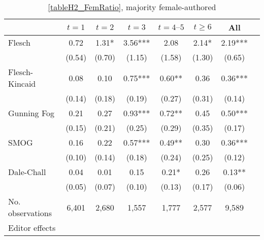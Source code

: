 \begin{table}
    \footnotesize
    \centering
    \begin{threeparttable}
        \caption{\autoref{tableH2_FemRatio}, majority female-authored}
        \label{tableH2_Fem50}
        \begin{tabular}{p{3cm}S@{}S@{}S@{}S@{}S@{}S@{}S@{}}
            \toprule
            &{\(t=1\)}&{\(t=2\)}&{\(t=3\)}&{\(t=4\text{--}5\)}&{\(t\ge6\)}&{All}\\
            \midrule
            Flesch                        &        0.72   &        1.31*  &        3.56***&        2.08   &        2.14*  &        2.19***\\
                                          &      (0.54)   &      (0.70)   &      (1.15)   &      (1.58)   &      (1.30)   &      (0.65)   \\
            Flesch-Kincaid                &        0.08   &        0.10   &        0.75***&        0.60** &        0.36   &        0.36***\\
                                          &      (0.14)   &      (0.18)   &      (0.19)   &      (0.27)   &      (0.31)   &      (0.14)   \\
            Gunning Fog                   &        0.21   &        0.27   &        0.93***&        0.72** &        0.45   &        0.50***\\
                                          &      (0.15)   &      (0.21)   &      (0.25)   &      (0.29)   &      (0.35)   &      (0.17)   \\
            SMOG                          &        0.16   &        0.22   &        0.57***&        0.49** &        0.30   &        0.36***\\
                                          &      (0.10)   &      (0.14)   &      (0.18)   &      (0.24)   &      (0.25)   &      (0.12)   \\
            Dale-Chall                    &        0.04   &        0.01   &        0.15   &        0.21*  &        0.26   &        0.13** \\
                                          &      (0.05)   &      (0.07)   &      (0.10)   &      (0.13)   &      (0.17)   &      (0.06)   \\
            \midrule
            No. observations              &       6,401   &       2,680   &       1,557   &       1,777   &       2,577   &       9,589   \\
            \midrule
            Editor effects       &           {}   &           {}   &           {}   &           {}   &           {}   &           {}   \\

\end{tabular}
\end{threeparttable}
\end{table}
